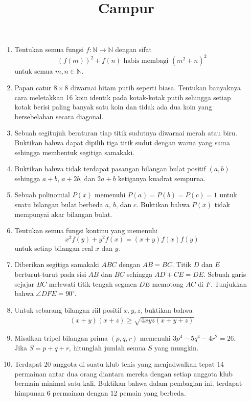 \documentclass[12pt]{scrartcl}
\title{Campur}
\begin{document}
\renewcommand*\contentsname{Daftar Isi}
\tableofcontents

\newpage
\begin{enumerate} 
    \item Tentukan semua fungsi \( f: \mathbb{N} \to \mathbb{N} \) dengan sifat
       \[
       (f(m))^2 + f(n) \text{ habis membagi } (m^2 + n)^2
       \]
       untuk semua \( m, n \in \mathbb{N} \).
    
    \item Papan catur \( 8 \times 8 \) diwarnai hitam putih seperti biasa. Tentukan banyaknya cara meletakkan 16 koin identik pada kotak-kotak putih sehingga setiap kotak berisi paling banyak satu koin dan tidak ada dua koin yang bersebelahan secara diagonal.
    
    \item Sebuah segitujuh beraturan tiap titik sudutnya diwarnai merah atau biru. Buktikan bahwa dapat dipilih tiga titik sudut dengan warna yang sama sehingga membentuk segitiga samakaki.

    \item Buktikan bahwa tidak terdapat pasangan bilangan bulat positif $(a, b)$ sehingga $a + b$, $a + 2b$, dan $2a + b$ ketiganya kuadrat sempurna.
    
    \item Sebuah polinomial $P(x)$ memenuhi $P(a) = P(b) = P(c) = 1$ untuk suatu bilangan bulat berbeda $a$, $b$, dan $c$. Buktikan bahwa $P(x)$ tidak mempunyai akar bilangan bulat.
    
    \item Tentukan semua fungsi kontinu yang memenuhi
        $$x^2f(y) + y^2f(x) = (x + y)f(x)f(y)$$
        untuk setiap bilangan real $x$ dan $y$.
        
    \item Diberikan segitiga samakaki $ABC$ dengan $AB = BC$. Titik $D$ dan $E$ berturut-turut pada sisi $AB$ dan $BC$ sehingga $AD + CE = DE$. Sebuah garis sejajar $BC$ melewati titik tengah segmen $DE$ memotong $AC$ di $F$. Tunjukkan bahwa $\angle DFE = 90^\circ$.

    \item Untuk sebarang bilangan riil positif $x,y,z$, buktikan bahwa
    \begin{align*}
        (x+y)(x+z) \ge \sqrt{4xyz(x+y+z)}
    \end{align*}

    \item Misalkan tripel bilangan prima $(p,q,r)$ memenuhi $3p^4-5q^4-4r^2=26$. Jika $S = p+q+r$, hitunglah jumlah semua $S$ yang mungkin.

    \item Terdapat 20 anggota di suatu klub tenis yang menjadwalkan tepat 14 permainan antar dua orang diantara mereka dengan setiap anggota klub bermain minimal satu kali. Buktikan bahwa dalam pembagian ini, terdapat himpunan 6 permainan dengan 12 pemain yang berbeda.

\end{enumerate}
\end{document}
